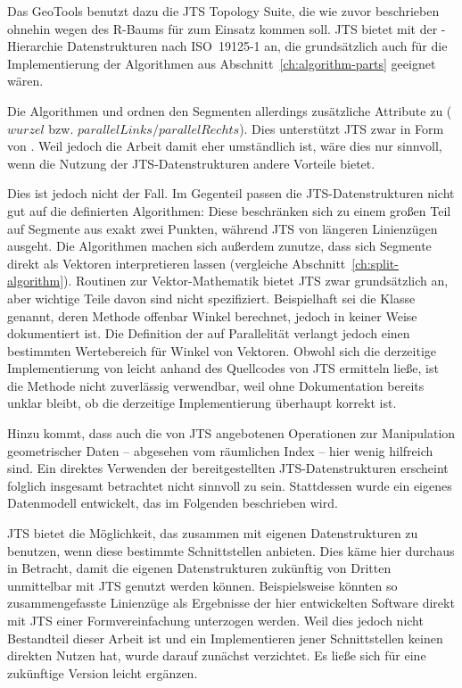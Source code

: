 \documentclass[../main/thesis.tex]{subfiles}
\begin{document}
\noindent
Das  GeoTools benutzt dazu die JTS Topology Suite, die wie zuvor beschrieben ohnehin wegen des R-Baums für  zum Einsatz kommen soll.
JTS bietet mit der -Hierarchie Datenstrukturen nach ISO~19125\hbox{-}1 an, die grundsätzlich auch für die Implementierung der Algorithmen aus Abschnitt~\ref{ch:algorithm-parts} geeignet wären.

Die Algorithmen  und  ordnen den Segmenten allerdings zusätzliche Attribute zu ($wurzel$ bzw. $parallelLinks / parallelRechts$).
Dies unterstützt JTS zwar in Form von .
Weil jedoch die Arbeit damit eher umständlich ist, wäre dies nur sinnvoll, wenn die Nutzung der JTS-Datenstrukturen andere Vorteile bietet.

Dies ist jedoch nicht der Fall.
Im Gegenteil passen die JTS-Datenstrukturen nicht gut auf die definierten Algorithmen:
Diese beschränken sich zu einem großen Teil auf Segmente aus exakt zwei Punkten, während JTS von längeren Linienzügen ausgeht.
Die Algorithmen machen sich außerdem zunutze, dass sich Segmente direkt als Vektoren interpretieren lassen (vergleiche Abschnitt~\ref{ch:split-algorithm}).
Routinen zur Vektor-Mathematik bietet JTS zwar grundsätzlich an, aber wichtige Teile davon sind nicht spezifiziert.
Beispielhaft sei die Klasse  genannt, deren Methode  offenbar Winkel berechnet, jedoch in keiner Weise dokumentiert ist.
Die Definition der  auf Parallelität verlangt jedoch einen bestimmten Wertebereich für Winkel von Vektoren.
Obwohl sich die derzeitige Implementierung von  leicht anhand des Quellcodes von JTS ermitteln ließe, ist die Methode nicht zuverlässig verwendbar, weil ohne Dokumentation bereits unklar bleibt, ob die derzeitige Implementierung überhaupt korrekt ist.

Hinzu kommt, dass auch die von JTS angebotenen Operationen zur Manipulation geometrischer Daten -- abgesehen vom räumlichen Index -- hier wenig hilfreich sind.
Ein direktes Verwenden der bereitgestellten JTS-Datenstrukturen erscheint folglich insgesamt betrachtet nicht sinnvoll zu sein.
Stattdessen wurde ein eigenes Datenmodell entwickelt, das im Folgenden beschrieben wird.

JTS bietet die Möglichkeit, das  zusammen mit eigenen Datenstrukturen zu benutzen, wenn diese bestimmte Schnittstellen anbieten.
Dies käme hier durchaus in Betracht, damit die eigenen Datenstrukturen zukünftig von Dritten unmittelbar mit JTS genutzt werden können.
Beispielsweise könnten so zusammengefasste Linienzüge als Ergebnisse der hier entwickelten Software direkt mit JTS einer Formvereinfachung unterzogen werden.
Weil dies jedoch nicht Bestandteil dieser Arbeit ist und ein Implementieren jener Schnittstellen keinen direkten Nutzen hat, wurde darauf zunächst verzichtet.
Es ließe sich für eine zukünftige Version leicht ergänzen.
\end{document}
